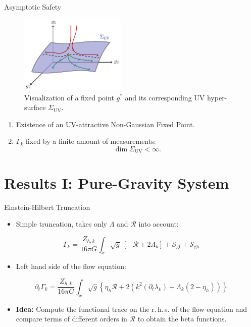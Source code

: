\documentclass{beamer}
\begin{document}
\begin{frame}{Asymptotic Safety}
\begin{figure}
	\centering
	\includegraphics[width=0.45\textwidth]{figures/hypersurface}
	\caption{Visualization of a fixed point $g^*$ and its corresponding UV hyper-\\ \hspace{1.4cm} surface $\Sigma_{\text{UV}}$.}
	\vspace{-0.3cm}
	\hrulefill
\end{figure}
\vspace{-0.2cm}
\begin{enumerate}
	\item Existence of an UV-attractive Non-Gaussian Fixed Point.\vspace{0.3cm}
	\item $\Gamma_k$ fixed by a finite amount of measurements:
	\begin{equation*}
		\operatorname{dim}\Sigma_{\mathrm{UV}} < \infty.
	\end{equation*} 
\end{enumerate} 
\end{frame}

\section{Results I: Pure-Gravity System}
\begin{frame}{Einstein-Hilbert Truncation}
\begin{itemize}
	\item Simple truncation, takes only $\Lambda$ and $\mathcal{R}$ into account:
	\end{itemize}
\begin{equation}
	\Gamma_k = \frac{Z_{h,k}}{16\pi G} \int_x \sqrt{g} \ [-\mathcal{R} + 2\Lambda_k] + \mathcal{S}_{\text{gf}} + \mathcal{S}_{\text{gh}}
\end{equation}
\begin{itemize}
	\item Left hand side of the flow equation:
\end{itemize}
\begin{equation}
	\partial_{t}\Gamma_{k} = \frac{Z_{h,k}}{16\pi G}\int_x \sqrt{g} \left\{\eta_h\mathcal{R}+2\left(k^2(\partial_t\lambda_k) + \Lambda_k(2 - \eta_h)\right)\right\}
\end{equation}
\begin{itemize}
	\item \textbf{Idea:} Compute the functional trace on the r.\,h.\,s. of the flow equation and compare terms of different orders in $\mathcal{R}$ to obtain the beta functions.
\end{itemize}
\end{frame}
\end{document}
